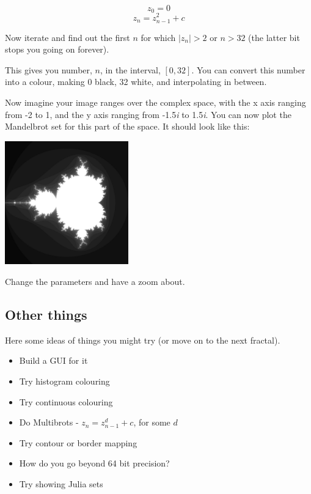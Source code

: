 \documentclass{article}
\begin{document}
        $$z_0 = 0$$
        $$z_n = z_{n-1}^2 + c$$
        
        Now iterate and find out the first $n$ for which $|z_n| > 2$ or $n > 32$ (the latter bit stops you going on forever).  
        
        This gives you number, $n$, in the interval, $[0,32]$. You can convert this number into a colour, making 0 black, 32 white, and
        interpolating in between.
        
        Now imagine your image ranges over the complex space, with the x axis ranging from -2 to 1, and the y axis ranging from
        -1.5\emph{i} to 1.5\emph{i}. You can now plot the Mandelbrot set for this part of the space. It should look like this:
        
        \begin{center}
            \includegraphics[width=0.4\textwidth]{mandelbrot}
        \end{center}
        
        Change the parameters and have a zoom about.
        
        \subsection{Other things}
            Here some ideas of things you might try (or move on to the next fractal).
            \begin{itemize}
                \item Build a GUI for it
                \item Try histogram colouring
                \item Try continuous colouring
                \item Do Multibrots - $z_n = z_{n-1}^d + c$, for some $d$
                \item Try contour or border mapping
                \item How do you go beyond 64 bit precision?
                \item Try showing Julia sets
            \end{itemize}
        \newpage
        
\end{document}
